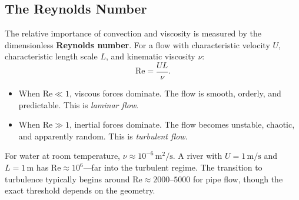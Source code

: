 \subsection{The Reynolds Number}

The relative importance of convection and viscosity is measured by the dimensionless \textbf{Reynolds number}. For a flow with characteristic velocity $U$, characteristic length scale $L$, and kinematic viscosity $\nu$:
\begin{equation}
\label{eq:Reynolds}
\mathrm{Re} = \frac{UL}{\nu}.
\end{equation}

\begin{itemize}
\item When $\mathrm{Re} \ll 1$, viscous forces dominate. The flow is smooth, orderly, and predictable. This is \textit{laminar flow}.
\item When $\mathrm{Re} \gg 1$, inertial forces dominate. The flow becomes unstable, chaotic, and apparently random. This is \textit{turbulent flow}.
\end{itemize}

For water at room temperature, $\nu \approx 10^{-6} \, \text{m}^2/\text{s}$. A river with $U = 1 \, \text{m/s}$ and $L = 1 \, \text{m}$ has $\mathrm{Re} \approx 10^6$---far into the turbulent regime. The transition to turbulence typically begins around $\mathrm{Re} \approx 2000$--$5000$ for pipe flow, though the exact threshold depends on the geometry.

